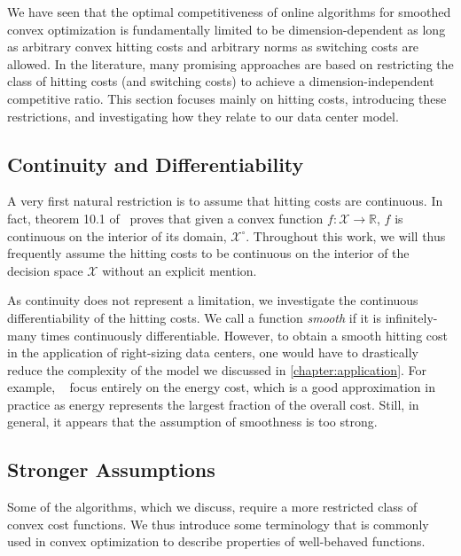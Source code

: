We have seen that the optimal competitiveness of online algorithms for smoothed convex optimization is fundamentally limited to be dimension-dependent as long as arbitrary convex hitting costs and arbitrary norms as switching costs are allowed. In the literature, many promising approaches are based on restricting the class of hitting costs (and switching costs) to achieve a dimension-independent competitive ratio. This section focuses mainly on hitting costs, introducing these restrictions, and investigating how they relate to our data center model.

\subsection{Continuity and Differentiability}\label{section:theory:beyond_convexity:continuity_and_differentiability}

A very first natural restriction is to assume that hitting costs are continuous. In fact, theorem 10.1 of~\cite{Rockafellar1970} proves that given a convex function $f : \mathcal{X} \to \mathbb{R}$, $f$ is continuous on the interior of its domain, $\mathcal{X}^{\circ}$. Throughout this work, we will thus frequently assume the hitting costs to be continuous on the interior of the decision space $\mathcal{X}$ without an explicit mention.

As continuity does not represent a limitation, we investigate the continuous differentiability of the hitting costs. We call a function \emph{smooth} if it is infinitely-many times continuously differentiable. However, to obtain a smooth hitting cost in the application of right-sizing data centers, one would have to drastically reduce the complexity of the model we discussed in \cref{chapter:application}. For example, \citeauthor*{Bansal2015}~\cite{Bansal2015} focus entirely on the energy cost, which is a good approximation in practice as energy represents the largest fraction of the overall cost. Still, in general, it appears that the assumption of smoothness is too strong.

\subsection{Stronger Assumptions}

Some of the algorithms, which we discuss, require a more restricted class of convex cost functions. We thus introduce some terminology that is commonly used in convex optimization to describe properties of well-behaved functions.

